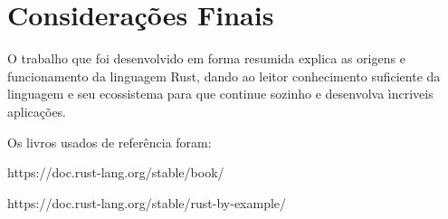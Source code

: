 

\chapter{Considera\c{c}\~{o}es Finais}
O trabalho que foi desenvolvido em forma resumida explica as origens e funcionamento da linguagem Rust, dando ao leitor conhecimento suficiente da linguagem e seu ecossistema para que continue sozinho e desenvolva ìncriveis aplicações.

\par
Os livros usados de referência foram:
\par
https://doc.rust-lang.org/stable/book/
\par
https://doc.rust-lang.org/stable/rust-by-example/
